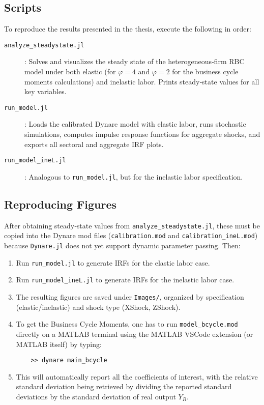 \documentclass[a4paper,12pt]{article} %
\numberwithin{equation}{section} %
\numberwithin{figure}{section}
\numberwithin{table}{section}
\begin{document}
\begin{refsection}
\begin{appendices}
\subsection{Scripts}

To reproduce the results presented in the thesis, execute the following in order:

\begin{description}
  \item[\texttt{analyze\_steadystate.jl}]: 
    Solves and visualizes the steady state of the heterogeneous‐firm RBC model under both elastic 
    (for $\varphi = 4$ and $\varphi = 2$ for the business cycle moments calculations) and inelastic labor. Prints steady‐state values for all key variables.
  \item[\texttt{run\_model.jl}]: 
    Loads the calibrated Dynare model with elastic labor, runs stochastic simulations, computes impulse response functions for aggregate shocks, and exports all sectoral and aggregate IRF plots.
  \item[\texttt{run\_model\_ineL.jl}]: 
    Analogous to \texttt{run\_model.jl}, but for the inelastic labor specification.
\end{description}

\subsection{Reproducing Figures}

After obtaining steady‐state values from \texttt{analyze\_steadystate.jl}, these must be copied into the Dynare mod files (\texttt{calibration.mod} and \texttt{calibration\_ineL.mod}) because \texttt{Dynare.jl} does not yet support dynamic parameter passing. Then:

\begin{enumerate}
  \item Run \texttt{run\_model.jl} to generate IRFs for the elastic labor case.
  \item Run \texttt{run\_model\_ineL.jl} to generate IRFs for the inelastic labor case.
  \item The resulting figures are saved under \texttt{Images/}, organized by specification 
  (elastic/inelastic) and shock type (XShock, ZShock).
  \item To get the Business Cycle Moments, one has to run \texttt{model\_bcycle.mod} directly on a MATLAB terminal
  using the MATLAB VSCode extension (or MATLAB itself) by typing:
    \begin{verbatim}
    >> dynare main_bcycle
    \end{verbatim}
  \item This will automatically report all the coefficients of interest, with the relative standard deviation being retrieved
  by dividing the reported standard deviations by the standard deviation of real output $Y_R$.
\end{enumerate}



\end{appendices}
\end{refsection}
\end{document}
